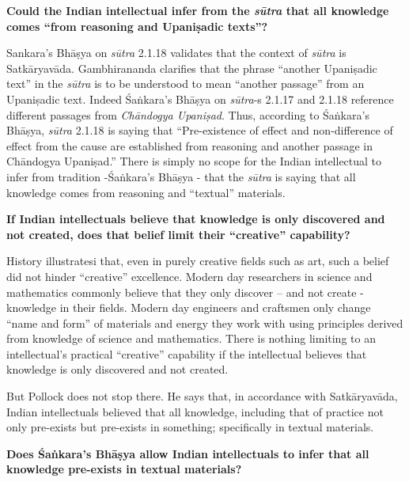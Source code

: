 \textbf{Could the Indian intellectual infer from the {{\sl\bfseries sūtra}\relax} that all knowledge comes ``from reasoning and Upaniṣadic texts''?}

Sankara's Bhāṣya on {\sl sūtra} 2.1.18 validates that the context of {\sl sūtra} is Satkāryavāda.  Gambhirananda clarifies that the phrase ``another Upaniṣadic text'' in the {\sl sūtra} is to be understood to mean ``another passage'' from an Upaniṣadic text. Indeed Śaṅkara's Bhāṣya on {\sl sūtra}-s 2.1.17 and 2.1.18 reference different passages from {\sl Chāndogya Upaniṣad}. Thus, according to Śaṅkara's Bhāṣya, {\sl sūtra} 2.1.18 is saying that ``Pre-existence of effect and non-difference of effect from the cause are established from reasoning and another passage in Chāndogya Upaniṣad.''  There is simply no scope for the Indian intellectual to infer from tradition -Śaṅkara's Bhāṣya - that the {\sl sūtra} is saying that all knowledge comes from reasoning and ``textual'' materials.

\textbf{If Indian intellectuals believe that knowledge is only discovered and not created, does that belief limit their ``creative'' capability?}

History illustratesi that, even in purely creative fields such as art, such a belief did not hinder ``creative'' excellence.  Modern day researchers in science and mathematics commonly believe that they only discover -- and not create - knowledge in their fields.  Modern day engineers and craftsmen only change ``name and form'' of materials and energy they work with using principles derived from knowledge of science and mathematics. There is nothing limiting to an intellectual's practical ``creative'' capability if the intellectual believes that knowledge is only discovered and not created.

But Pollock does not stop there.  He says that, in accordance with Satkāryavāda, Indian intellectuals believed that all knowledge, including that of practice not only pre-exists but pre-exists in something; specifically in textual materials.

\textbf{Does Śaṅkara's Bhāṣya allow Indian intellectuals to infer that all knowledge pre-exists in textual materials?}

